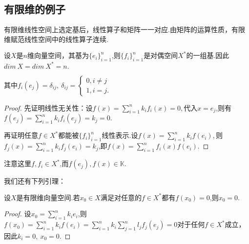 \documentclass[lang=cn,10pt]{elegantbook}
\begin{document}
	\subsection{有限维的例子}
	\begin{theorem}[有限维线性算子和矩阵]
		有限维线性空间上选定基后，线性算子和矩阵一一对应.由矩阵的运算性质，有限维赋范线性空间中的线性算子连续.
	\end{theorem}
	\begin{theorem}[对偶空间维数(2.9-1)]
		设\(X\)是\(n\)维向量空间，其基为\(\{e_i\}_{i=1}^n\),则\(\{f_i\}_{i=1}^n\)是对偶空间\(X^*\)的一组基.因此\(dim\ X=dim\ X^*=n.\)
		
		其中\(f_i(e_j)=\delta_{ij},\ \delta_{ij}=\begin{cases}
			0,i\ne j \\
			1,i=j.
		\end{cases}\)
	\end{theorem}
	\begin{proof}
		先证明线性无关性：设\(f(x)=\sum_{i=1}^nk_if_i(x)=0,\)代入\(x=e_j\),则有\(f(e_j)=\sum_{i=1}^nk_if_i(e_j)=k_j=0.\)
		
		再证明任意\(f\in X^*\)都能被\(\{f_i\}_{i=1}^n\)线性表示.设\(f(x)=\sum_{i=1}^nk_if(e_i),\)则\(f_j(x)=\sum_{i=1}^nk_if_j(e_i)=k_j\),即\(f(x)=\sum_{i=1}^nf_i(x)f(e_i)\).
	\end{proof}
	\begin{note}
		注意这里\(f,f_i\in X^*\),而\(f(e_j),f(x)\in \mathbb{K}\).
	\end{note}
	我们还有下列引理：
	\begin{lemma}[2.9-2]
		设\(X\)是有限维向量空间.若\(x_0\in X\)满足对任意的\(f\in X^*\)都有\(f(x_0)=0\),则\(x_0=0.\)
	\end{lemma}
	\begin{proof}
		设\(x_0=\sum_{i=1}^nk_ie_i\),则\(f(x_0)=\sum_{i=1}^nk_if(e_i)=\sum_{i=1}^nk_i\sum_{j=1}^nl_jf_j(e_j)=0\)对于任何\(f\in X^*\)成立，因此\(k_i=0,\ x_0=0.\)
	\end{proof}
	
	
\end{document}
